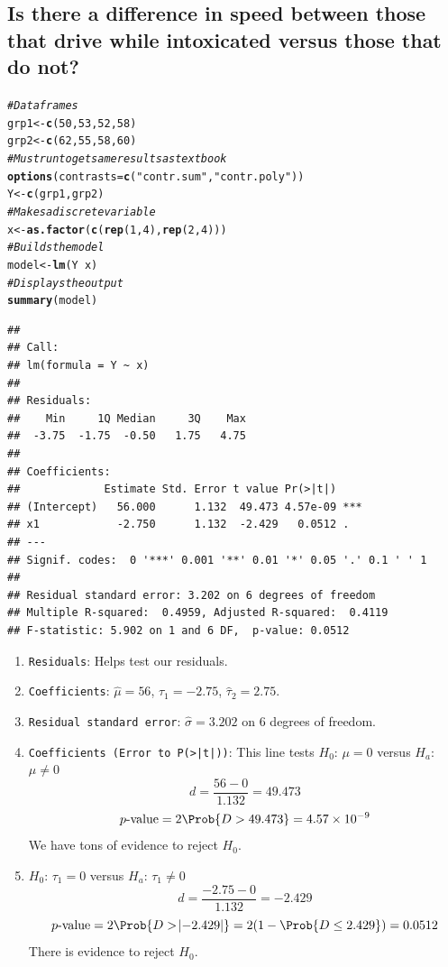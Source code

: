\documentclass[oneside]{book}\usepackage[]{graphicx}\usepackage[dvipsnames,table,xcdraw]{xcolor}
\makeatletter
\newcommand{\hlnum}[1]{\textcolor[rgb]{0.686,0.059,0.569}{#1}}%
\newcommand{\hlstr}[1]{\textcolor[rgb]{0.192,0.494,0.8}{#1}}%
\newcommand{\hlcom}[1]{\textcolor[rgb]{0.678,0.584,0.686}{\textit{#1}}}%
\newcommand{\hlopt}[1]{\textcolor[rgb]{0,0,0}{#1}}%
\newcommand{\hlstd}[1]{\textcolor[rgb]{0.345,0.345,0.345}{#1}}%
\newcommand{\hlkwb}[1]{\textcolor[rgb]{0.69,0.353,0.396}{#1}}%
\newcommand{\hlkwc}[1]{\textcolor[rgb]{0.333,0.667,0.333}{#1}}%
\newcommand{\hlkwd}[1]{\textcolor[rgb]{0.737,0.353,0.396}{\textbf{#1}}}%
\newenvironment{kframe}{%
 \def\at@end@of@kframe{}%
 \ifinner\ifhmode%
  \def\at@end@of@kframe{\end{minipage}}%
  \begin{minipage}{\columnwidth}%
 \fi\fi%
 \def\FrameCommand##1{\hskip\@totalleftmargin \hskip-\fboxsep
 \colorbox{shadecolor}{##1}\hskip-\fboxsep
     \hskip-\linewidth \hskip-\@totalleftmargin \hskip\columnwidth}%
 \MakeFramed {\advance\hsize-\width
   \@totalleftmargin\z@ \linewidth\hsize
   \@setminipage}}%
 {\par\unskip\endMakeFramed%
 \at@end@of@kframe}
\newenvironment{knitrout}{}{} %
\newcommand{\code}[1]{\texttt{#1}}
\makeatother
\begin{document}
\subsection*{Is there a difference in speed between those that drive while
    intoxicated versus those that do not?}
\begin{knitrout}
\color{fgcolor}\begin{kframe}
\begin{alltt}
\hlcom{# Data frames}
\hlstd{grp1} \hlkwb{<-} \hlkwd{c}\hlstd{(}\hlnum{50}\hlstd{,} \hlnum{53}\hlstd{,} \hlnum{52}\hlstd{,} \hlnum{58}\hlstd{)}
\hlstd{grp2} \hlkwb{<-} \hlkwd{c}\hlstd{(}\hlnum{62}\hlstd{,} \hlnum{55}\hlstd{,} \hlnum{58}\hlstd{,} \hlnum{60}\hlstd{)}
\hlcom{# Must run to get same results as textbook}
\hlkwd{options}\hlstd{(}\hlkwc{contrasts} \hlstd{=} \hlkwd{c}\hlstd{(}\hlstr{"contr.sum"}\hlstd{,} \hlstr{"contr.poly"}\hlstd{))}
\hlstd{Y} \hlkwb{<-} \hlkwd{c}\hlstd{(grp1, grp2)}
\hlcom{# Makes a discrete variable}
\hlstd{x} \hlkwb{<-} \hlkwd{as.factor}\hlstd{(}\hlkwd{c}\hlstd{(}\hlkwd{rep}\hlstd{(}\hlnum{1}\hlstd{,} \hlnum{4}\hlstd{),} \hlkwd{rep}\hlstd{(}\hlnum{2}\hlstd{,} \hlnum{4}\hlstd{)))}
\hlcom{# Builds the model}
\hlstd{model} \hlkwb{<-} \hlkwd{lm}\hlstd{(Y} \hlopt{~} \hlstd{x)}
\hlcom{# Displays the output}
\hlkwd{summary}\hlstd{(model)}
\end{alltt}
\begin{verbatim}
## 
## Call:
## lm(formula = Y ~ x)
## 
## Residuals:
##    Min     1Q Median     3Q    Max 
##  -3.75  -1.75  -0.50   1.75   4.75 
## 
## Coefficients:
##             Estimate Std. Error t value Pr(>|t|)    
## (Intercept)   56.000      1.132  49.473 4.57e-09 ***
## x1            -2.750      1.132  -2.429   0.0512 .  
## ---
## Signif. codes:  0 '***' 0.001 '**' 0.01 '*' 0.05 '.' 0.1 ' ' 1
## 
## Residual standard error: 3.202 on 6 degrees of freedom
## Multiple R-squared:  0.4959,	Adjusted R-squared:  0.4119 
## F-statistic: 5.902 on 1 and 6 DF,  p-value: 0.0512
\end{verbatim}
\end{kframe}
\end{knitrout}

\begin{enumerate}[(1)]
    \item \code{Residuals}: Helps test our residuals.
    \item \code{Coefficients}: $ \hat{\mu}=56 $, $ \hat{\tau}_1=-2.75 $, $ \hat{\tau}_2=2.75 $.
    \item \code{Residual standard error}: $ \hat{\sigma}=3.202 $ on 6 degrees of freedom.
    \item \code{Coefficients (Error to P(>|t|))}: This line tests $ H_0 $: $ \mu=0 $ versus $ H_a $: $ \mu\ne 0 $
          \[ d=\frac{56-0}{1.132} =49.473 \]
          \[ p\text{-value}=2\Prob{D>49.473}=4.57\times 10^{-9} \]
          We have tons of evidence to reject $ H_0 $.
    \item $ H_0 $: $ \tau_1=0 $ versus $ H_a $: $ \tau_1\ne 0 $
          \[ d=\frac{-2.75-0}{1.132} =-2.429 \]
          \[ p\text{-value}=2\Prob{D>\abs{-2.429}}=2(1-\Prob{D\le 2.429})=0.0512 \]
          There is evidence to reject $ H_0 $.
\end{enumerate}
\end{document}
